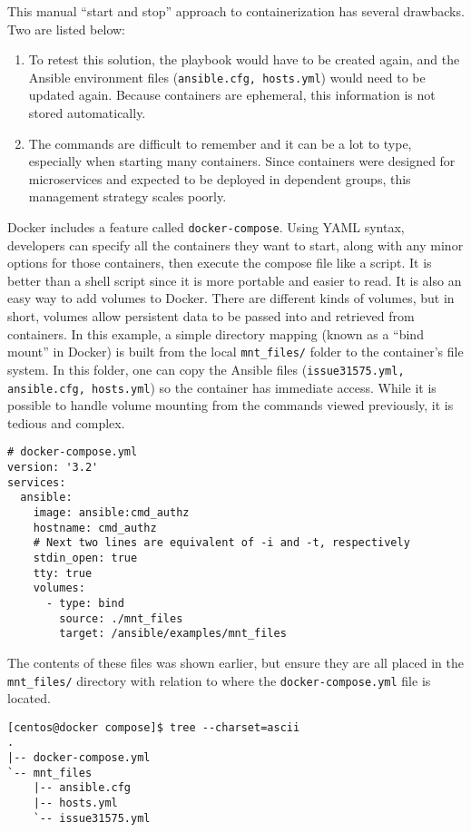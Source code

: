 This manual ``start and stop'' approach to containerization has several
drawbacks. Two are listed below:
\begin{enumerate}
  \item	To retest this solution, the playbook would have to be created again,
  and the Ansible environment files (\verb|ansible.cfg, hosts.yml|) would need
  to be updated again. Because containers are ephemeral, this information is
  not stored automatically.
  \item	The commands are difficult to remember and it can be a lot to type,
  especially when starting many containers. Since containers were designed for
  microservices and expected to be deployed in dependent groups, this
  management strategy scales poorly.
\end{enumerate}
  
Docker includes a feature called \verb|docker-compose|. Using YAML syntax,
developers can specify all the containers they want to start, along with any minor
options for those containers, then execute the compose file like a script. It
is better than a shell script since it is more portable and easier to read. It
is also an easy way to add volumes to Docker. There are different kinds of
volumes, but in short, volumes allow persistent data to be passed into and
retrieved from containers. In this example, a simple directory mapping (known
as a ``bind mount'' in Docker) is built from the local \verb|mnt_files/| folder to the
container's file system. In this folder, one can copy the Ansible files
(\verb|issue31575.yml, ansible.cfg, hosts.yml|) so the container has immediate
access. While it is possible to handle volume mounting from the commands
viewed previously, it is tedious and complex.

\begin{verbatim}
# docker-compose.yml 
version: '3.2'
services:
  ansible:
    image: ansible:cmd_authz
    hostname: cmd_authz
    # Next two lines are equivalent of -i and -t, respectively
    stdin_open: true
    tty: true
    volumes:
      - type: bind
        source: ./mnt_files
        target: /ansible/examples/mnt_files
\end{verbatim}

The contents of these files was shown earlier, but ensure they are all placed
in the \verb|mnt_files/| directory with relation to where the
\verb|docker-compose.yml| file is located.

\begin{verbatim}
[centos@docker compose]$ tree --charset=ascii
.
|-- docker-compose.yml
`-- mnt_files
    |-- ansible.cfg
    |-- hosts.yml
    `-- issue31575.yml
\end{verbatim}

